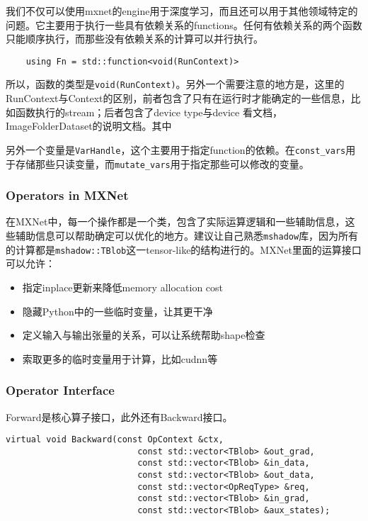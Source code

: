 我们不仅可以使用mxnet的engine用于深度学习，而且还可以用于其他领域特定的问题。它主要用于执行一些具有依赖关系的functions。任何有依赖关系的两个函数只能顺序执行，而那些没有依赖关系的计算可以并行执行。

\begin{verbatim}
    using Fn = std::function<void(RunContext)>
\end{verbatim}

所以，函数的类型是\verb|void(RunContext)|。另外一个需要注意的地方是，这里的RunContext与Context的区别，前者包含了只有在运行时才能确定的一些信息，比如函数执行的stream；后者包含了device type与device 看文档，ImageFolderDataset的说明文档。其中

另外一个变量是\verb|VarHandle|，这个主要用于指定function的依赖。在\verb|const_vars|用于存储那些只读变量，而\verb|mutate_vars|用于指定那些可以修改的变量。

\subsubsection{Operators in MXNet}

在MXNet中，每一个操作都是一个类，包含了实际运算逻辑和一些辅助信息，这些辅助信息可以帮助确定可以优化的地方。建议让自己熟悉\verb|mshadow|库，因为所有的计算都是\verb|mshadow::TBlob|这一tensor-like的结构进行的。MXNet里面的运算接口可以允许：

\begin{itemize}    
    \item 指定inplace更新来降低memory allocation cost
    \item 隐藏Python中的一些临时变量，让其更干净
    \item 定义输入与输出张量的关系，可以让系统帮助shape检查
    \item 索取更多的临时变量用于计算，比如cudnn等
\end{itemize}

\subsubsection{Operator Interface}

Forward是核心算子接口，此外还有Backward接口。

\lstset{language=C++}
\begin{lstlisting}
virtual void Backward(const OpContext &ctx,
                          const std::vector<TBlob> &out_grad,
                          const std::vector<TBlob> &in_data,
                          const std::vector<TBlob> &out_data,
                          const std::vector<OpReqType> &req,
                          const std::vector<TBlob> &in_grad,
                          const std::vector<TBlob> &aux_states);
\end{lstlisting}

